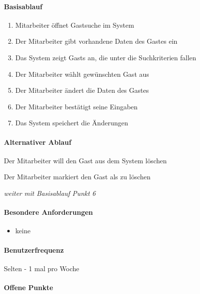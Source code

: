 \paragraph{Basisablauf}
\begin{enumerate}
	\item \Gls{Mitarbeiter} öffnet Gastsuche im System
	\item Der \Gls{Mitarbeiter} gibt vorhandene Daten des Gastes ein
	\item Das System zeigt \Glspl{Gast} an, die unter die Suchkriterien fallen
	\item Der \Gls{Mitarbeiter} wählt gewünschten \Gls{Gast} aus
	\item Der \Gls{Mitarbeiter} ändert die Daten des \Gls{Gast}es
	\item Der \Gls{Mitarbeiter} bestätigt seine Eingaben
	\item Das System speichert die Änderungen
\end{enumerate}

\paragraph{Alternativer Ablauf}
\begin{longenum}
	\item
	\item
	\item
	\item
	\item
	\begin{longenum}
		\item Der \Gls{Mitarbeiter} will den \Gls{Gast} aus dem System löschen
		\begin{longenum}
			\item Der Mitarbeiter markiert den Gast als zu löschen
			\item \emph{weiter mit Basisablauf Punkt 6}
		\end{longenum}
	\end{longenum}
\end{longenum}

\paragraph{Besondere Anforderungen}
\begin{itemize}
	\item keine
\end{itemize}

\paragraph{Benutzerfrequenz}
Selten - 1 mal pro Woche

\paragraph{Offene Punkte}

\newpage
